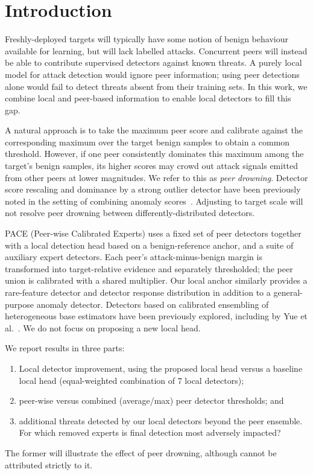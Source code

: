 \section{Introduction} 
\label{sec:intro} 
Freshly-deployed targets will typically have some notion of benign behaviour available for learning, but will lack labelled attacks. Concurrent peers will instead be able to contribute supervised detectors against known threats. A purely local model for attack detection would ignore peer information; using peer detections alone would fail to detect threats absent from their training sets. In this work, we combine local and peer-based information to enable local detectors to fill this gap.

A natural approach is to take the maximum peer score and calibrate against the corresponding maximum over the target benign samples to obtain a common threshold. However, if one peer consistently dominates this maximum among the target's benign samples, its higher scores may crowd out attack signals emitted from other peers at lower magnitudes. We refer to this as \emph{peer drowning}. Detector score rescaling and dominance by a strong outlier detector have been previously noted in the setting of combining anomaly scores~\cite{zimek2014}. Adjusting to target scale will not resolve peer drowning between differently-distributed detectors.

PACE (Peer-wise Calibrated Experts) uses a fixed set of peer detectors together with a local detection head based on a benign-reference anchor, and a suite of auxiliary expert detectors. Each peer's attack-minus-benign margin is transformed into target-relative evidence and separately thresholded; the peer union is calibrated with a shared multiplier. Our local anchor similarly provides a rare-feature detector and detector response distribution in addition to a general-purpose anomaly detector. Detectors based on calibrated ensembling of heterogeneous base estimators have been previously explored, including by Yue et al.~\cite{yue2026mcde}. We do not focus on proposing a new local head.

We report results in three parts: 
\begin{enumerate} 
\item Local detector improvement, using the proposed local head versus a baseline local head (equal-weighted combination of 7 local detectors);
\item peer-wise versus combined (average/max) peer detector thresholds; and
\item additional threats detected by our local detectors beyond the peer ensemble. For which removed experts is final detection most adversely impacted?
\end{enumerate} 
The former will illustrate the effect of peer drowning, although cannot be attributed strictly to it.

